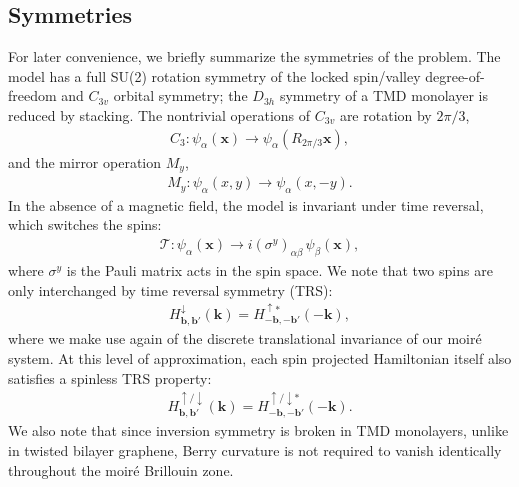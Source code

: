 \documentclass[%
 reprint,
 superscriptaddress,
 amsmath,amssymb,
 aps,
 prx,
 floatfix,
]{revtex4-2}
\newcommand{\<}{\langle}
\renewcommand{\>}{\rangle}
\renewcommand{\(}{\left(}
\renewcommand{\)}{\right)}
\renewcommand{\[}{\left[}
\renewcommand{\]}{\right]}
\renewcommand{\b}[1]{\mathbf{#1}} %
\newcommand{\T}{\mathcal{T}}
\begin{document}
\subsection{Symmetries}
For later convenience, we briefly summarize the symmetries of the problem. 
The model has a full SU(2) rotation symmetry of the locked spin/valley degree-of-freedom
and $C_{3v}$ orbital symmetry; the  $D_{3h}$ symmetry of a TMD monolayer is reduced by stacking.
The nontrivial operations of $C_{3v}$ are rotation by 
$2 \pi /3$,
\begin{align}
   C_3:  \psi_{\alpha}(\b{x}) \rightarrow \psi_{\alpha}(R_{2\pi/3}\b{x}),
\end{align}
and the mirror operation $M_y$,
\begin{align}
    M_y:  \psi_{\alpha}(x,y) \rightarrow \psi_{\alpha}(x,-y).
\end{align}
In the absence of a magnetic field, the model is invariant under time reversal, which switches the spins:
\begin{align}
    \T: \psi_{\alpha}(\b{x}) \rightarrow i(\sigma^y)_{\alpha\beta} \, \psi_{\beta}(\b{x}),
\end{align}
where $\sigma^y$ is the Pauli matrix acts in the spin space. We note that two spins are only interchanged by time reversal symmetry (TRS):
\begin{align}
    H^{\downarrow}_{\b{b},\b{b}'}(\b{k}) = H^{\uparrow*}_{-\b{b},-\b{b}'}(-\b{k}),
\end{align}
where we make use again of the discrete translational invariance of our moir\'e system.
At this level of approximation, each spin projected Hamiltonian itself also satisfies a spinless TRS property:
\begin{align}
    H^{\uparrow/\downarrow}_{\b{b},\b{b}'}(\b{k}) = H^{\uparrow/\downarrow*}_{-\b{b},-\b{b}'}(-\b{k}).
\end{align}
We also note that since inversion symmetry is broken in TMD monolayers, unlike in twisted bilayer graphene, Berry curvature is not required to vanish identically throughout the moir\'e Brillouin zone.
\end{document}
